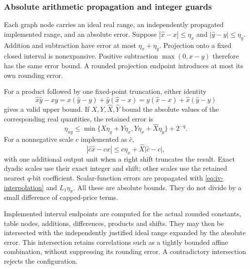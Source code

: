 \subsubsection{Absolute arithmetic propagation and integer guards}

Each graph node carries an ideal real range, an independently propagated
implemented range, and an absolute error.  Suppose
$|\widehat x-x|\leq\eta_x$ and $|\widehat y-y|\leq\eta_y$.
Addition and subtraction have error at most $\eta_x+\eta_y$.  Projection
onto a fixed closed interval is nonexpansive.  Positive subtraction
$\max(0,x-y)$ therefore has the same error bound.  A rounded projection
endpoint introduces at most its own rounding error.

For a product followed by one fixed-point truncation, either identity
\begin{equation}
 \widehat x\widehat y-xy=x(\widehat y-y)+\widehat y(\widehat x-x)
 =y(\widehat x-x)+\widehat x(\widehat y-y)
 \label{eq:iv-product-identity}
\end{equation}
gives a valid upper bound.  If $X,Y,\widehat X,\widehat Y$ bound the absolute
values of the corresponding real quantities, the retained error is
\begin{equation}
 \eta_{xy}\leq
 \min\{X\eta_y+\widehat Y\eta_x,
        Y\eta_x+\widehat X\eta_y\}+2^{-q}.
 \label{eq:iv-product-error}
\end{equation}
For a nonnegative scale $c$ implemented as $\widehat c$,
\begin{equation}
 |\widehat c\widehat x-cx|\leq
 c\eta_x+\widehat X|\widehat c-c|,
 \label{eq:iv-scale-error}
\end{equation}
with one additional output unit when a right shift truncates the result.
Exact dyadic scales use their exact integer and shift; other scales use the
retained nearest $q$-bit coefficient.  Scalar-function errors are propagated
with \eqref{eq:iv-interpolation} and $L_1\eta_x$.  All these are absolute
bounds.  They do not divide by a small difference of capped-price terms.

Implemented interval endpoints are computed for the actual rounded
constants, table nodes, additions, differences, products and shifts.  They
may then be intersected with the independently justified ideal range
expanded by the absolute error.  This intersection retains correlations
such as a tightly bounded affine combination, without suppressing its
rounding error.  A contradictory intersection rejects the configuration.

